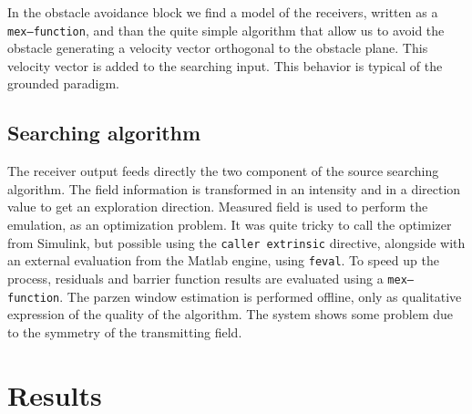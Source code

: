 In the obstacle avoidance block we find a model of the receivers, written as a \texttt{mex--function}, and than the quite simple algorithm that allow us to avoid the obstacle generating a velocity vector orthogonal to the obstacle plane. This velocity vector is added to the searching input. This behavior is typical of the grounded paradigm.

\subsection{Searching algorithm}

The receiver output feeds directly the two component of the source searching algorithm. The field information is transformed in an intensity and in a direction value to get an exploration direction. Measured field is used to perform the emulation, as an optimization problem. It was quite tricky to call the optimizer from Simulink, but possible using the \texttt{caller extrinsic} directive, alongside with an external evaluation from the Matlab engine, using \texttt{feval}. To speed up the process, residuals and barrier function results are evaluated using a \texttt{mex--function}. The parzen window estimation is performed offline, only as qualitative expression of the quality of the algorithm. The system shows some problem due to the symmetry of the transmitting field.

\section{Results}

